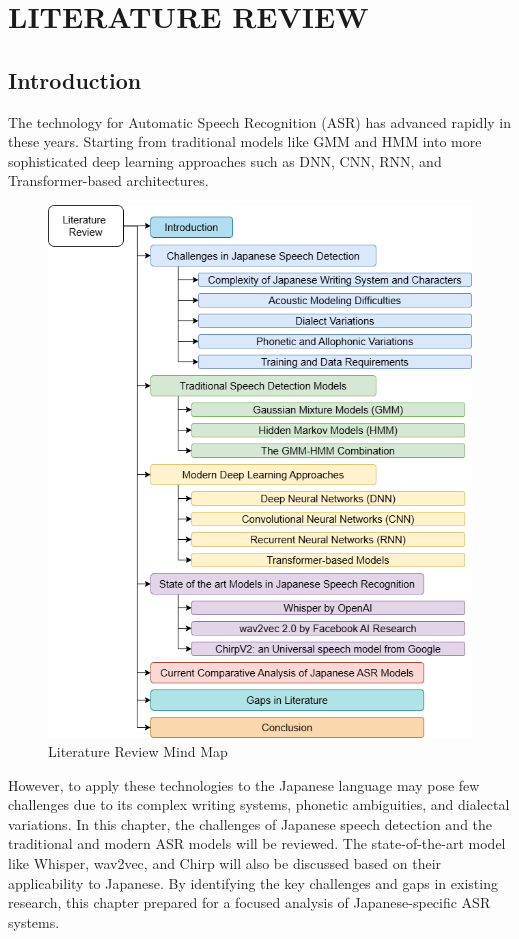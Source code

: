\chapter{LITERATURE REVIEW}

\section{Introduction}
The technology for Automatic Speech Recognition (ASR) has advanced rapidly in these years. Starting from traditional models like GMM and HMM into more sophisticated deep learning approaches such as DNN, CNN, RNN, and Transformer-based architectures. 

\begin{figure}[H]
    \centering
    \includegraphics[width=.9\textwidth]{mainmatter//images/mindmap.png}
    \caption{Literature Review Mind Map}
\end{figure}

However, to apply these technologies to the Japanese language may pose few challenges due to its complex writing systems, phonetic ambiguities, and dialectal variations. In this chapter, the challenges of Japanese speech detection and the traditional and modern ASR models will be reviewed. The state-of-the-art model like Whisper, wav2vec, and Chirp will also be discussed based on their applicability to Japanese. By identifying the key challenges and gaps in existing research, this chapter prepared for a focused analysis of Japanese-specific ASR systems.

